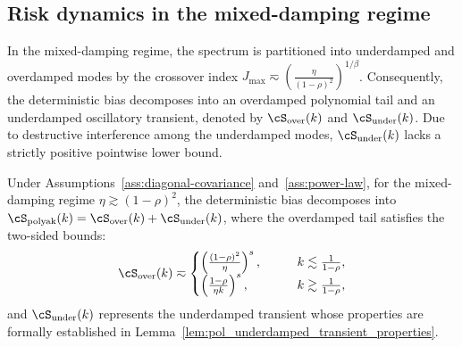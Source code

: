 \documentclass[11pt]{article}
\newcommand{\polyak}{\mathrm{polyak}}
\begin{document}
\subsection{Risk dynamics in the mixed-damping regime}
\label{app:pol_mixed_loss}

In the mixed-damping regime, the spectrum is partitioned into underdamped and overdamped modes by the crossover index $J_{\max} \eqsim \left(\frac{\eta}{(1-\rho)^2}\right)^{1/\beta}$. Consequently, the deterministic bias decomposes into an overdamped polynomial tail and an underdamped oscillatory transient, denoted by $\cS_{\mathrm{over}}(k)$ and $\cS_{\mathrm{under}}(k)$. Due to destructive interference among the underdamped modes, $\cS_{\mathrm{under}}(k)$ lacks a strictly positive pointwise lower bound. 

\begin{proposition}
\label{prop:pol_deterministic_bias}
Under Assumptions~\ref{ass:diagonal-covariance} and~\ref{ass:power-law}, for the mixed-damping regime \(\eta\gtrsim(1-\rho)^2\), the deterministic bias decomposes into $\cS_{\polyak}(k) = \cS_{\mathrm{over}}(k) + \cS_{\mathrm{under}}(k)$, where the overdamped tail satisfies the two-sided bounds:
\begin{equation*}
    \cS_{\mathrm{over}}(k)
    \eqsim
    \begin{cases}
    \left(\frac{(1-\rho)^2}{\eta}\right)^s, &\qquad k\lesssim\frac{1}{1-\rho},\\
    \left(\frac{1-\rho}{\eta k}\right)^s, &\qquad k\gtrsim\frac{1}{1-\rho},
    \end{cases}
\end{equation*}
and $\cS_{\mathrm{under}}(k)$ represents the underdamped transient whose properties are formally established in Lemma~\ref{lem:pol_underdamped_transient_properties}.
\end{proposition}
\end{document}
